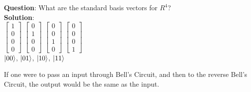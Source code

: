 \begin{exercise}
    \textbf{Question}: What are the standard basis vectors for $R^4$?\\

    \textbf{Solution}:\\
    $\begin{bmatrix}
        1\\
        0\\
        0\\
        0
    \end{bmatrix}$
    $\begin{bmatrix}
        0\\
        1\\
        0\\
        0
    \end{bmatrix}$
    $\begin{bmatrix}
        0\\
        0\\
        1\\
        0
    \end{bmatrix}$
    $\begin{bmatrix}
        0\\
        0\\
        0\\
        1
    \end{bmatrix}$\\
    $\lvert00\rangle$, $\lvert01\rangle$, $\lvert10\rangle$, $\lvert11\rangle$
\end{exercise}

If one were to pass an input through Bell's Circuit, and then to the reverse Bell's Circuit, the output would be the same as the input.



